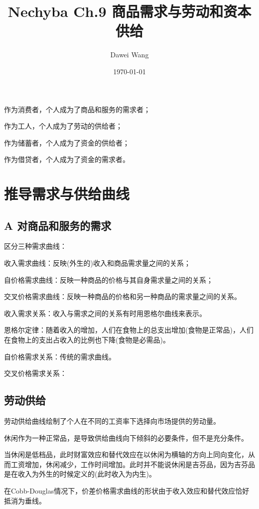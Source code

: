 \documentclass{article}
\title{Nechyba Ch.9 商品需求与劳动和资本供给}
\author{Dawei Wang}
\date{\today}
\begin{document}
	\maketitle
作为消费者，个人成为了商品和服务的需求者；

作为工人，个人成为了劳动的供给者；

作为储蓄者，个人成为了资金的供给者；

作为借贷者，个人成为了资金的需求者。

\section{推导需求与供给曲线}

\subsection{A 对商品和服务的需求}

区分三种需求曲线：

收入需求曲线：反映(外生的)收入和商品需求量之间的关系；

自价格需求曲线：反映一种商品的价格与其自身需求量之间的关系；

交叉价格需求曲线：反映一种商品的价格和另一种商品的需求量之间的关系。

\hspace*{\fill}

收入需求关系：收入与需求之间的关系有时用恩格尔曲线来表示。

恩格尔定律：随着收入的增加，人们在食物上的总支出增加(食物是正常品)，人们在食物上的支出占收入的比例也下降(食物是必需品)。

\hspace*{\fill}

自价格需求关系：传统的需求曲线。

\hspace*{\fill}

交叉价格需求关系：

\subsection{劳动供给}

劳动供给曲线绘制了个人在不同的工资率下选择向市场提供的劳动量。

休闲作为一种正常品，是导致供给曲线向下倾斜的必要条件，但不是充分条件。

当休闲是低档品，此时财富效应和替代效应在以休闲为横轴的方向上同向变化，从而工资增加，休闲减少，工作时间增加。此时并不能说休闲是吉芬品，因为吉芬品是在收入为外生的时候定义的(此时收入为内生)。

\hspace*{\fill}

在Cobb-Douglas情况下，价差价格需求曲线的形状由于收入效应和替代效应恰好抵消为垂线。
\end{document}
